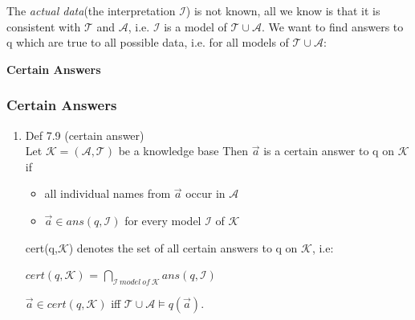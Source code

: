 \documentclass[11pt]{article}
\begin{document}
The \textit{actual data}(the interpretation $\mathcal{I}$) is not 
known, all we know is that it is consistent with $\mathcal{T}$ and 
$\mathcal{A}$, i.e. $\mathcal{I}$ is a model of $\mathcal{T} \cup  
   \mathcal{A}$.
We want to find answers to q which are true to all possible data,
i.e. for all models of $\mathcal{T} \cup \mathcal{A}$:
\begin{center}
\textbf{Certain Answers}
\end{center}

\subsubsection{Certain Answers}
\label{sec-1-2-1}
\begin{enumerate}
\item Def 7.9 (certain answer) \\
\label{sec-1-2-1-1}
Let $\mathcal{K} = (\mathcal{A}, \mathcal{T})$ be a knowledge base
Then $\overset{\to}{a}$ is a certain answer to q on $\mathcal{K}$ if
\begin{itemize}
\item all individual names from $\overset{\to}{a}$ occur in 
$\mathcal{A}$
\item $\overset{\to}{a} \in ans(q, \mathcal{I})$ for every model
$\mathcal{I}$ of $\mathcal{K}$
\end{itemize}
cert(q,$\mathcal{K}$) denotes the set of all certain answers to q
on $\mathcal{K}$, i.e: \\
\begin{center}
$cert(q,\mathcal{K})$ = $\bigcap_{\mathcal{I} \ model \ of \ \mathcal{K}} ans(q, \mathcal{I})$
\end{center}

$\overset{\to}{a} \in cert(q,\mathcal{K})$ iff 
$\mathcal{T} \cup \mathcal{A} \models q(\overset{\to}{a})$.
\end{enumerate}
\end{document}
